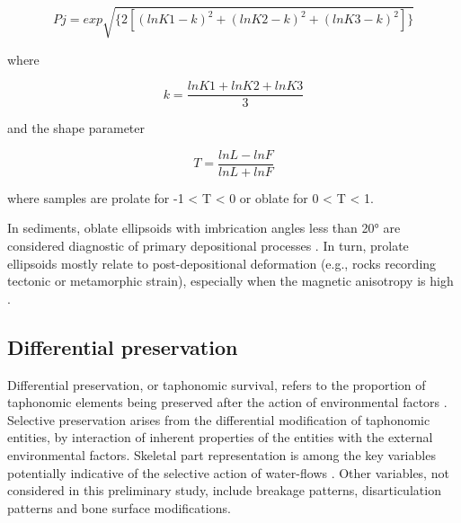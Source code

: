 \documentclass[review,times,authoryear]{elsarticle} %
\begin{document}
$$Pj=exp\sqrt{\{2[(lnK1-k)^2+(lnK2-k)^2+(lnK3-k)^2]\}}$$

where

$$k=\frac{lnK1+lnK2+lnK3}{3}$$

and the shape parameter

$$T=\frac{lnL-lnF}{lnL+lnF}$$

where samples are prolate for -1 < T < 0 or oblate for 0 < T < 1.

In sediments, oblate ellipsoids with imbrication angles less than 20° are considered diagnostic of primary depositional processes \citep{Hamilton1970,Hrouda1982,Tarling1993,Liu2001,Lanza2006}. In turn, prolate ellipsoids mostly relate to post-depositional deformation (e.g., rocks recording tectonic or metamorphic strain), especially when the magnetic anisotropy is high \citep{Hrouda1976}.

\subsection{Differential preservation}

Differential preservation, or taphonomic survival, refers to the proportion of taphonomic elements being preserved after the action of environmental factors \citep{Fernandez-Lopez2006}. Selective preservation arises from the differential modification of taphonomic entities, by interaction of inherent properties of the entities with the external environmental factors. Skeletal part representation is among the key variables potentially indicative of the selective action of water-flows \citep[][among others]{Behrensmeyer1975a,Kaufmann2011,Voorhies1969}. Other variables, not considered in this preliminary study, include breakage patterns, disarticulation patterns and bone surface modifications.
\end{document}
